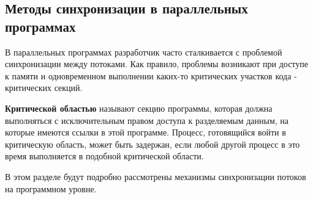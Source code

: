 \subsection{Методы синхронизации в параллельных программах}

В параллельных программах разработчик часто сталкивается с проблемой синхронизации между потоками. Как правило, проблемы возникают при доступе к памяти и одновременном выполнении каких-то критических участков кода - критических секций.

\textbf{Критической областью} называют секцию программы, которая должна выполняться с исключительным правом доступа к разделяемым данным, на которые имеются ссылки в этой программе. Процесс, готовящийся войти в критическую область, может быть задержан, если любой другой процесс в это время выполняется в подобной критической области.

В этом разделе будут подробно рассмотрены механизмы синхронизации потоков на программном уровне.

